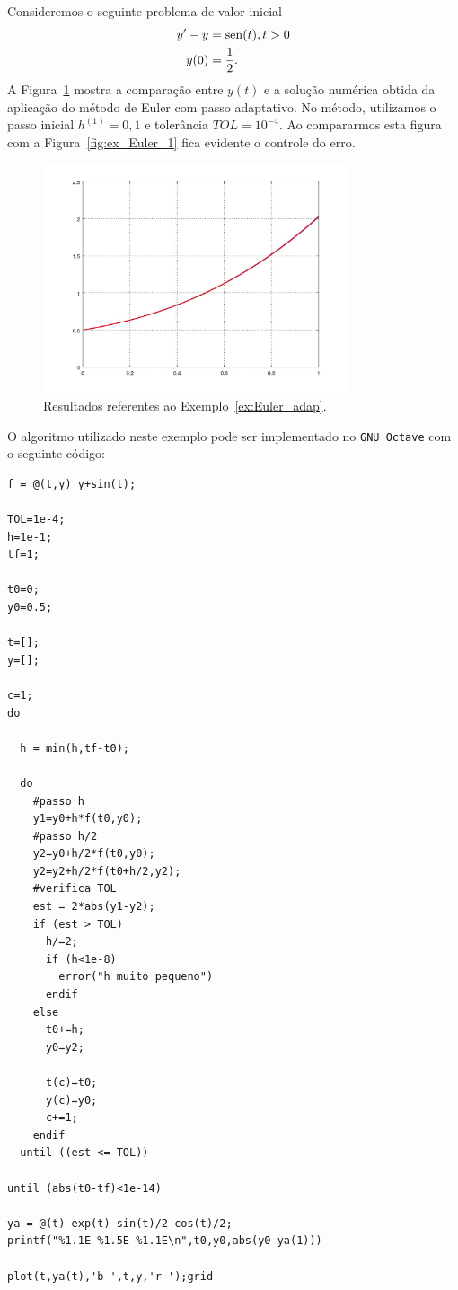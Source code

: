 \begin{ex}\label{ex:Euler_adap}
  Consideremos o seguinte problema de valor inicial
  \begin{align}
    y' - y &= \operatorname{sen}(t), t>0\\
    y(0) &= \frac{1}{2}.
  \end{align}
  A Figura~\ref{fig:ex_Euler_adap} mostra a comparação entre $y(t)$ e a solução numérica obtida da aplicação do método de Euler com passo adaptativo. No método, utilizamos o passo inicial $h^{(1)}=0,1$ e tolerância $TOL=10^{-4}$. Ao compararmos esta figura com a Figura~\eqref{fig:ex_Euler_1} fica evidente o controle do erro.

  \begin{figure}[h!]
    \centering
    \includegraphics[width=0.8\textwidth]{./cap_pvi/dados/ex_Euler_adap/ex_Euler_adap}
    \caption{Resultados referentes ao Exemplo~\ref{ex:Euler_adap}.}
    \label{fig:ex_Euler_adap}
  \end{figure}

\ifisoctave
O algoritmo utilizado neste exemplo pode ser implementado no \verb+GNU Octave+ com o seguinte código:
\begin{verbatim}
f = @(t,y) y+sin(t);

TOL=1e-4;
h=1e-1;
tf=1;

t0=0;
y0=0.5;

t=[];
y=[];

c=1;
do

  h = min(h,tf-t0);
 
  do
    #passo h
    y1=y0+h*f(t0,y0);
    #passo h/2
    y2=y0+h/2*f(t0,y0);
    y2=y2+h/2*f(t0+h/2,y2);
    #verifica TOL
    est = 2*abs(y1-y2);
    if (est > TOL)
      h/=2;
      if (h<1e-8)
        error("h muito pequeno")
      endif
    else
      t0+=h;
      y0=y2;
      
      t(c)=t0;
      y(c)=y0;
      c+=1;
    endif
  until ((est <= TOL))
  
until (abs(t0-tf)<1e-14)

ya = @(t) exp(t)-sin(t)/2-cos(t)/2;
printf("%1.1E %1.5E %1.1E\n",t0,y0,abs(y0-ya(1)))

plot(t,ya(t),'b-',t,y,'r-');grid
\end{verbatim}
\fi

\end{ex}

